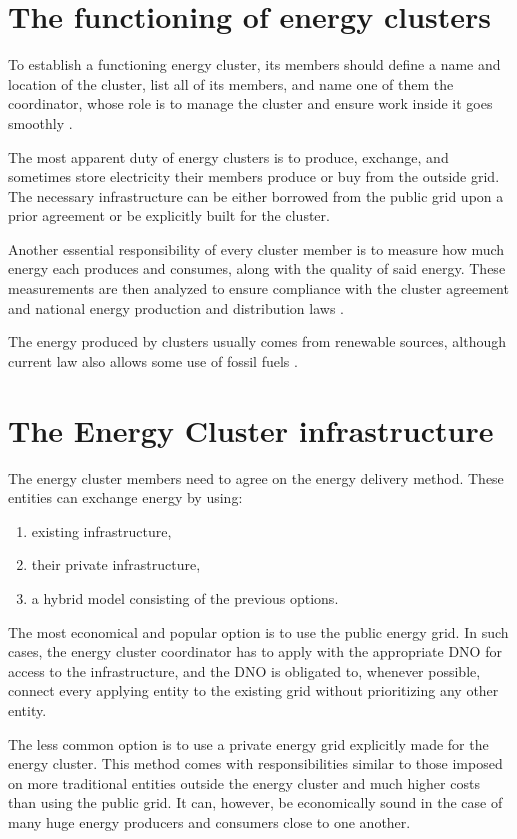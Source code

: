 \section{The functioning of energy clusters}

\par To establish a functioning energy cluster, its members should define a name and location of the cluster, list all of its members, and name one of them the coordinator, whose role is to manage the cluster and ensure work inside it goes smoothly \citep{ksiazka}.
\par The most apparent duty of energy clusters is to produce, exchange, and sometimes store electricity their members produce or buy from the outside grid. The necessary infrastructure can be either borrowed from the public grid upon a prior agreement or be explicitly built for the cluster.
\par Another essential responsibility of every cluster member is to measure how much energy each produces and consumes, along with the quality of said energy. These measurements are then analyzed to ensure compliance with the cluster agreement and national energy production and distribution laws \citep{ksiazka}.
\par The energy produced by clusters usually comes from renewable sources, although current law also allows some use of fossil fuels \citep{UwarunkowaniaRozwojuEnergetykiRozproszonej}.

\section{The Energy Cluster infrastructure}

\par The energy cluster members need to agree on the energy delivery method. These entities can exchange energy by using: 
\begin{enumerate}
  \item existing infrastructure,
  \item their private infrastructure, 
  \item a hybrid model consisting of the previous options.
\end{enumerate}
\par The most economical and popular option is to use the public energy grid. In such cases, the energy cluster coordinator has to apply with the appropriate DNO for access to the infrastructure, and the DNO is obligated to, whenever possible, connect every applying entity to the existing grid without prioritizing any other entity.
\par The less common option is to use a private energy grid explicitly made for the energy cluster. This method comes with responsibilities similar to those imposed on more traditional entities outside the energy cluster and much higher costs than using the public grid. It can, however, be economically sound in the case of many huge energy producers and consumers close to one another.

